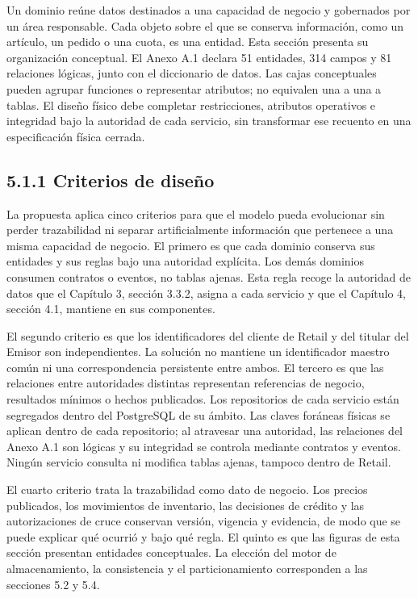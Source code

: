 \documentclass[11pt]{article}
\begin{document}
Un dominio reúne datos destinados a una capacidad de negocio y gobernados por un área responsable. Cada objeto sobre el que se conserva información, como un artículo, un pedido o una cuota, es una entidad. Esta sección presenta su organización conceptual. El Anexo A.1 declara 51 entidades, 314 campos y 81 relaciones lógicas, junto con el diccionario de datos. Las cajas conceptuales pueden agrupar funciones o representar atributos; no equivalen una a una a tablas. El diseño físico debe completar restricciones, atributos operativos e integridad bajo la autoridad de cada servicio, sin transformar ese recuento en una especificación física cerrada.

\subsection{5.1.1 Criterios de diseño}

La propuesta aplica cinco criterios para que el modelo pueda evolucionar sin perder trazabilidad ni separar artificialmente información que pertenece a una misma capacidad de negocio. El primero es que cada dominio conserva sus entidades y sus reglas bajo una autoridad explícita. Los demás dominios consumen contratos o eventos, no tablas ajenas. Esta regla recoge la autoridad de datos que el Capítulo 3, sección 3.3.2, asigna a cada servicio y que el Capítulo 4, sección 4.1, mantiene en sus componentes.

El segundo criterio es que los identificadores del cliente de Retail y del titular del Emisor son independientes. La solución no mantiene un identificador maestro común ni una correspondencia persistente entre ambos. El tercero es que las relaciones entre autoridades distintas representan referencias de negocio, resultados mínimos o hechos publicados. Los repositorios de cada servicio están segregados dentro del PostgreSQL de su ámbito. Las claves foráneas físicas se aplican dentro de cada repositorio; al atravesar una autoridad, las relaciones del Anexo A.1 son lógicas y su integridad se controla mediante contratos y eventos. Ningún servicio consulta ni modifica tablas ajenas, tampoco dentro de Retail.

El cuarto criterio trata la trazabilidad como dato de negocio. Los precios publicados, los movimientos de inventario, las decisiones de crédito y las autorizaciones de cruce conservan versión, vigencia y evidencia, de modo que se puede explicar qué ocurrió y bajo qué regla. El quinto es que las figuras de esta sección presentan entidades conceptuales. La elección del motor de almacenamiento, la consistencia y el particionamiento corresponden a las secciones 5.2 y 5.4.
\end{document}
